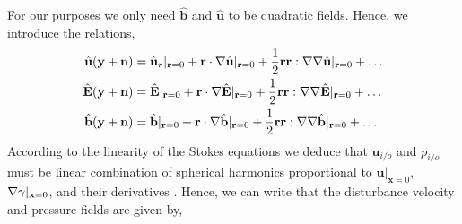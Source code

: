 For our purposes we only need $\hat{\textbf{b}}$ and $\hat{\textbf{u}}$ to be quadratic fields.
Hence, we introduce the relations, 
\begin{align*}
    \hat{\textbf{u}}(\textbf{y} + \textbf{n}) 
    &=  \hat{\textbf{u}}_r|_{\textbf{r}=0}
    +  \textbf{r} \cdot  \mathbf{\nabla}\hat{\textbf{u}}|_{\textbf{r}=0}
    +  \frac{1}{2}\textbf{rr} :  \mathbf{\nabla}\mathbf{\nabla}\hat{\textbf{u}}|_{\textbf{r}=0}
    + \ldots\\
     \hat{\textbf{E}}(\textbf{y} + \textbf{n}) 
    &=   \hat{\textbf{E}}|_{\textbf{r}=0}
    + \textbf{r} \cdot  \mathbf{\nabla} \hat{\textbf{E}}|_{\textbf{r}=0}
    + \frac{1}{2}\textbf{rr} :  \mathbf{\nabla}\mathbf{\nabla} \hat{\textbf{E}}|_{\textbf{r}=0}
    + \ldots\\
     \hat{\textbf{b}}(\textbf{y} + \textbf{n}) 
    &=   \hat{\textbf{b}}|_{\textbf{r}=0}
    + \textbf{r} \cdot  \mathbf{\nabla} \hat{\textbf{b}}|_{\textbf{r}=0}
    + \frac{1}{2}\textbf{rr} :  \mathbf{\nabla}\mathbf{\nabla} \hat{\textbf{b}}|_{\textbf{r}=0}
    + \ldots
\end{align*}
According to the linearity of the Stokes equations we deduce that $\textbf{u}_{i/o}$ and $p_{i/o}$  must be linear combination of spherical harmonics proportional to $\textbf{u}|_{\textbf{x}=0}$, $\mathbf{\nabla} \gamma|_{\textbf{x}=0}$, and their derivatives \citep{brenner1963resistance}.
Hence, we can write that the disturbance velocity and pressure fields are given by, 
